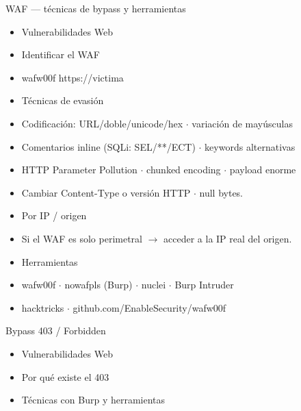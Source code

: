 \documentclass[aspectratio=169,10pt]{beamer}
\begin{document}
\begin{frame}[allowframebreaks]{WAF --- técnicas de bypass y herramientas}
\small
  \begin{itemize}
  \item Vulnerabilidades Web
  \item Identificar el WAF
  \item wafw00f https://victima
  \item Técnicas de evasión
  \item Codificación: URL/doble/unicode/hex $\cdot$ variación de mayúsculas
  \item Comentarios inline (SQLi: SEL/**/ECT) $\cdot$ keywords alternativas
  \item HTTP Parameter Pollution $\cdot$ chunked encoding $\cdot$ payload enorme
  \item Cambiar Content-Type o versión HTTP $\cdot$ null bytes.
  \item Por IP / origen
  \item Si el WAF es solo perimetral $\rightarrow$ acceder a la IP real del origen.
  \item Herramientas
  \item wafw00f $\cdot$ nowafpls (Burp) $\cdot$ nuclei $\cdot$ Burp Intruder
  \item hacktricks $\cdot$ github.com/EnableSecurity/wafw00f
  \end{itemize}
\end{frame}

\begin{frame}[allowframebreaks]{Bypass 403 / Forbidden}
\small
  \begin{itemize}
  \item Vulnerabilidades Web
  \item Por qué existe el 403
  \item Técnicas con Burp y herramientas
  \end{itemize}
\end{frame}
\end{document}
